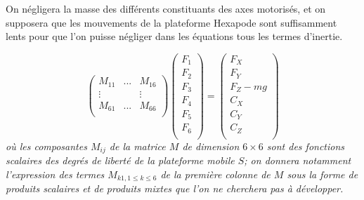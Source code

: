 On négligera la masse des différents constituants des axes motorisés, et on supposera que les mouvements de la
plateforme Hexapode sont suffisamment lents pour que l’on puisse négliger dans les équations tous les termes
d’inertie.

\ifprof
\begin{corrige}
\end{corrige}
\else
\fi


$$
\begin{pmatrix}
M_{11} & ... & M_{16} \\
\vdots    &     & \vdots \\
M_{61} & ... & M_{66} \\
\end{pmatrix}
\begin{pmatrix}
F_1 \\ F_2 \\ F_3 \\ F_4 \\ F_5 \\ F_6 \\
\end{pmatrix}
=
\begin{pmatrix}
F_X \\ F_Y \\ F_Z-mg \\ C_X \\ C_Y \\ C_Z \\
\end{pmatrix}
$$
\textit{où les composantes $M_{ij}$ de la matrice $M$ de dimension $6\times 6$ sont des fonctions scalaires des degrés de liberté
de la plateforme mobile $S$; on donnera notamment l’expression des termes $M_{k1,1\leq k \leq 6}$ de la première colonne
de $M$ sous la forme de produits scalaires et de produits mixtes que l’on ne cherchera pas à développer.}
\ifprof
\begin{corrige}
\end{corrige}
\else
\fi


